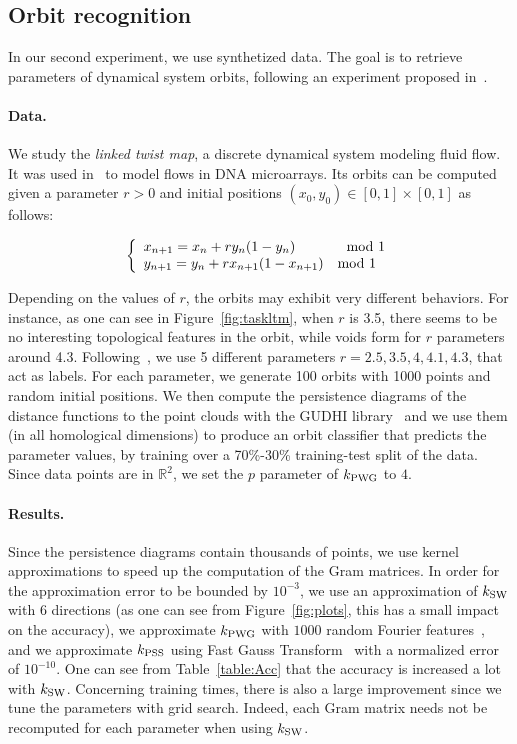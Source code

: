 \documentclass[11pt]{article}
\newcommand{\R}{\mathbb{R}}
\newcommand{\kPSS}{k_{\rm PSS}}
\newcommand{\kPWG}{k_{\rm PWG}}
\newcommand{\kSW}{k_{\rm SW}}
\begin{document}
\subsection{Orbit recognition}\label{sec:expeorbit}

In our second experiment, we use synthetized data.
The goal is to retrieve parameters of dynamical system orbits,
following an experiment proposed in~\cite{Adams17}.

\paragraph*{Data.} We study the {\em linked twist map}, a discrete dynamical system modeling
fluid flow. It was used in~\cite{Hertzsch07} to model flows in DNA microarrays.
Its orbits can be computed given a parameter $r>0$ and
initial positions $(x_0,y_0)\in[0,1]\times[0,1]$ as follows:

\[\left\{\begin{array}{l} x_{n+1} = x_n + ry_n(1-y_n)\ \ \ \ \ \ \ \ \ \ \ {\rm mod}\ 1 \\ y_{n+1} = y_n + rx_{n+1}(1-x_{n+1})\ \ \ {\rm mod}\ 1 \end{array}\right.\]

Depending on the values of $r$, the orbits may exhibit very different behaviors. For instance,
as one can see in Figure~\ref{fig:taskltm}, when $r$ is 3.5, there seems to be no interesting topological features
in the orbit, while voids form for $r$ parameters around 4.3.
Following~\cite{Adams17}, we use 5 different parameters $r=2.5,3.5,4,4.1,4.3$, that act as labels.
For each parameter, we generate 100 orbits with 1000 points and random initial positions. We then compute
the persistence diagrams of the distance functions to the point clouds with the GUDHI library~\cite{gudhi} and we use them (in all homological dimensions) 
to produce an orbit classifier
that predicts the parameter values, by training over a 70\%-30\% training-test split of the data.
Since data points are in $\R^2$, we set the $p$ parameter of $\kPWG$ to $4$. \\

\paragraph*{Results.} Since the persistence diagrams contain thousands of points, we use kernel approximations
to speed up the computation of the Gram matrices.
In order for the approximation error to be bounded by $10^{-3}$, 
we use an approximation of $\kSW$ with $6$ directions (as one can see from Figure~\ref{fig:plots}, 
this has a small impact on the accuracy), we approximate $\kPWG$ with $1000$ random Fourier features~\cite{Rahimi08},
and we approximate $\kPSS$ using Fast Gauss Transform~\cite{Morariu09}
with a normalized error of $10^{-10}$. 
One can see from Table~\ref{table:Acc} that the accuracy is increased a lot with $\kSW$.
Concerning training times, there is also a large improvement since we tune the parameters with grid search. 
Indeed, each Gram matrix needs not be recomputed for each parameter when using $\kSW$.
\end{document}
